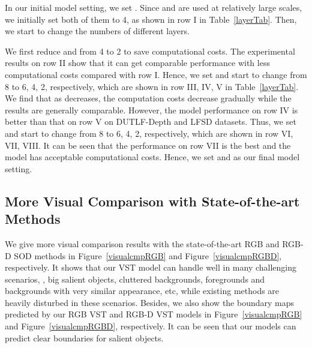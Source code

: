 \documentclass[10pt,twocolumn,letterpaper]{article}
\begin{document}
In our initial model setting, we set . Since  and  are used at relatively large scales, we initially set both of them to 4, as shown in row I in Table~\ref{layerTab}. Then, we start to change the numbers of different layers.

We first reduce  and  from 4 to 2 to save computational costs.
The experimental results on row II show that it can get comparable performance with less computational costs compared with row I.
Hence, we set  and start to change  from 8 to 6, 4, 2, respectively, which are shown in row III, IV, V in Table~\ref{layerTab}.
We find that as  decreases, the computation costs decrease gradually while the results are generally comparable.
However, the model performance on row IV is better than that on row V on DUTLF-Depth and LFSD datasets.
Thus, we set  and start to change  from 8 to 6, 4, 2, respectively, which are shown in row VI, VII, VIII.
It can be seen that the performance on row VII is the best and the model has acceptable computational costs.
Hence, we set  and  as our final model setting.


\subsection{More Visual Comparison with State-of-the-art Methods}
We give more visual comparison results with the state-of-the-art RGB and RGB-D SOD methods in Figure~\ref{visualcmpRGB} and Figure~\ref{visualcmpRGBD}, respectively. It shows that our VST model can handle well in many challenging scenarios, \ie, big salient objects, cluttered backgrounds, foregrounds and backgrounds with very similar appearance, etc, while existing methods are heavily disturbed in these scenarios.
Besides, we also show the boundary maps predicted by our RGB VST and RGB-D VST models in Figure~\ref{visualcmpRGB} and Figure~\ref{visualcmpRGBD}, respectively. It can be seen that our models can predict clear boundaries for salient objects.
\end{document}
